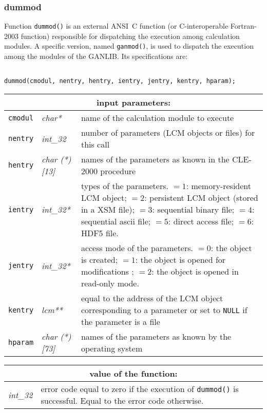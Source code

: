 \subsubsection{dummod}

Function {\tt dummod()} is an external ANSI~C function (or C-interoperable Fortran-2003 function) responsible for dispatching the execution among calculation modules.
A specific version, named {\tt ganmod()}, is used to dispatch the execution among the modules of the GANLIB. Its specifications are:
\begin{verbatim}

dummod(cmodul, nentry, hentry, ientry, jentry, kentry, hparam);
\end{verbatim}

\vskip 0.8cm

\noindent
\begin{tabular}{|p{1.5cm}|p{2cm}|p{11cm}|}
\hline
\multicolumn{3}{|c|}{\bf input parameters:} \\
\hline
{\tt cmodul} & {\it char*} & name of the calculation module to execute \\
\hline
{\tt nentry} & {\it int\_32} & number of parameters (LCM objects or files) for this call \\
\hline
{\tt hentry} & {\it char (*)[13]} & names of the parameters as known in the CLE-2000 procedure\\
\hline
{\tt ientry}  & {\it int\_32*} & types of the parameters. $=1$: memory-resident LCM object; $=2$: persistent LCM object (stored in a XSM file); 
$=3$: sequential binary file;
$=4$: sequential ascii file;
$=5$: direct access file;
$=6$: HDF5 file. \\
\hline
{\tt jentry}  & {\it int\_32*} & access mode of the parameters. $=0$: the object is created; $=1$: the object is opened for modifications ; $=2$: the object is opened in read-only mode. \\
\hline
{\tt kentry}  & {\it lcm**} & equal to the address of the LCM object corresponding to a parameter or set to {\tt NULL} if the parameter is a file \\
\hline
{\tt hparam}  & {\it char (*)[73]} &names of the parameters as known by the operating system  \\
\hline
\end{tabular}

\vskip 0.4cm

\noindent
\begin{tabular}{|p{4.0cm}|p{11cm}|}
\hline
\multicolumn{2}{|c|}{\bf value of the function:} \\
\hline
{\it int\_32} & error code equal to zero if the execution of {\tt dummod()} is successful. Equal to the error code otherwise. \\
\hline
\end{tabular}

